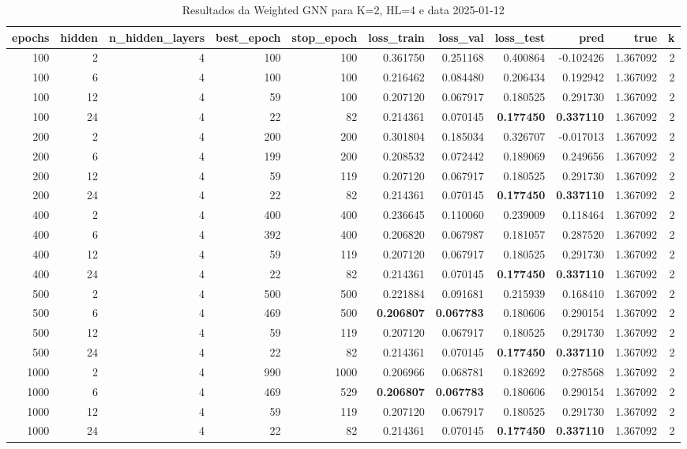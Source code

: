 \begin{table}
\caption{Resultados da Weighted GNN para K=2, HL=4 e data 2025-01-12}
\label{tab:weighted_gnn_results_k2_hl4_d20250112}
\begin{tabular}{rrrrrrrrrrr}
\toprule
epochs & hidden & n\_hidden\_layers & best\_epoch & stop\_epoch & loss\_train & loss\_val & loss\_test & pred & true & k \\
\midrule
100 & 2 & 4 & 100 & 100 & 0.361750 & 0.251168 & 0.400864 & -0.102426 & 1.367092 & 2 \\
100 & 6 & 4 & 100 & 100 & 0.216462 & 0.084480 & 0.206434 & 0.192942 & 1.367092 & 2 \\
100 & 12 & 4 & 59 & 100 & 0.207120 & 0.067917 & 0.180525 & 0.291730 & 1.367092 & 2 \\
100 & 24 & 4 & 22 & 82 & 0.214361 & 0.070145 & \textbf{0.177450} & \textbf{0.337110} & 1.367092 & 2 \\
200 & 2 & 4 & 200 & 200 & 0.301804 & 0.185034 & 0.326707 & -0.017013 & 1.367092 & 2 \\
200 & 6 & 4 & 199 & 200 & 0.208532 & 0.072442 & 0.189069 & 0.249656 & 1.367092 & 2 \\
200 & 12 & 4 & 59 & 119 & 0.207120 & 0.067917 & 0.180525 & 0.291730 & 1.367092 & 2 \\
200 & 24 & 4 & 22 & 82 & 0.214361 & 0.070145 & \textbf{0.177450} & \textbf{0.337110} & 1.367092 & 2 \\
400 & 2 & 4 & 400 & 400 & 0.236645 & 0.110060 & 0.239009 & 0.118464 & 1.367092 & 2 \\
400 & 6 & 4 & 392 & 400 & 0.206820 & 0.067987 & 0.181057 & 0.287520 & 1.367092 & 2 \\
400 & 12 & 4 & 59 & 119 & 0.207120 & 0.067917 & 0.180525 & 0.291730 & 1.367092 & 2 \\
400 & 24 & 4 & 22 & 82 & 0.214361 & 0.070145 & \textbf{0.177450} & \textbf{0.337110} & 1.367092 & 2 \\
500 & 2 & 4 & 500 & 500 & 0.221884 & 0.091681 & 0.215939 & 0.168410 & 1.367092 & 2 \\
500 & 6 & 4 & 469 & 500 & \textbf{0.206807} & \textbf{0.067783} & 0.180606 & 0.290154 & 1.367092 & 2 \\
500 & 12 & 4 & 59 & 119 & 0.207120 & 0.067917 & 0.180525 & 0.291730 & 1.367092 & 2 \\
500 & 24 & 4 & 22 & 82 & 0.214361 & 0.070145 & \textbf{0.177450} & \textbf{0.337110} & 1.367092 & 2 \\
1000 & 2 & 4 & 990 & 1000 & 0.206966 & 0.068781 & 0.182692 & 0.278568 & 1.367092 & 2 \\
1000 & 6 & 4 & 469 & 529 & \textbf{0.206807} & \textbf{0.067783} & 0.180606 & 0.290154 & 1.367092 & 2 \\
1000 & 12 & 4 & 59 & 119 & 0.207120 & 0.067917 & 0.180525 & 0.291730 & 1.367092 & 2 \\
1000 & 24 & 4 & 22 & 82 & 0.214361 & 0.070145 & \textbf{0.177450} & \textbf{0.337110} & 1.367092 & 2 \\
\bottomrule
\end{tabular}
\end{table}

